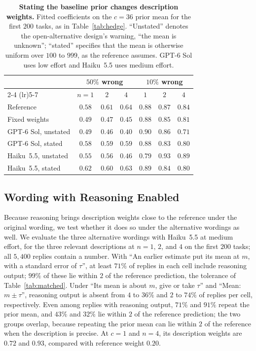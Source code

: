 \documentclass{article}
\theoremstyle{definition}
\begin{document}
\begin{table}[!htb]
\centering\small
\setlength{\tabcolsep}{3pt}
\caption{\textbf{Stating the baseline prior changes description weights.} Fitted coefficients on the $c=36$ prior mean for the first $200$ tasks, as in Table~\ref{tab:hedge}. ``Unstated'' denotes the open-alternative design's warning, ``the mean is unknown''; ``stated'' specifies that the mean is otherwise uniform over $100$ to $999$, as the reference assumes. GPT-6 Sol uses low effort and Haiku~5.5 uses medium effort.}
\label{tab:fallback}
\vspace{3pt}
\begin{tabular}{lcccccc}
\toprule
& \multicolumn{3}{c}{$50\%$ wrong} & \multicolumn{3}{c}{$10\%$ wrong} \\
\cmidrule(lr){2-4} \cmidrule(lr){5-7}
& $n=1$ & $2$ & $4$ & $1$ & $2$ & $4$ \\
\midrule
Reference & $0.58$ & $0.61$ & $0.64$ & $0.88$ & $0.87$ & $0.84$ \\
Fixed weights &$0.49$ & $0.47$ & $0.45$ & $0.88$ & $0.85$ & $0.81$ \\
GPT-6 Sol, unstated & $0.49$ & $0.46$ & $0.40$ & $0.90$ & $0.86$ & $0.71$ \\
GPT-6 Sol, stated & $0.58$ & $0.59$ & $0.59$ & $0.88$ & $0.83$ & $0.80$ \\
Haiku~5.5, unstated & $0.55$ & $0.56$ & $0.46$ & $0.79$ & $0.93$ & $0.89$ \\
Haiku~5.5, stated & $0.62$ & $0.60$ & $0.63$ & $0.89$ & $0.84$ & $0.80$ \\
\bottomrule
\end{tabular}
\end{table}

\subsection{Wording with Reasoning Enabled}\label{app:wording-reasoning}

Because reasoning brings description weights close to the reference under the original wording, we test whether it does so under the alternative wordings as well. We evaluate the three alternative wordings with Haiku~5.5 at medium effort, for the three relevant descriptions at $n = 1$, $2$, and $4$ on the first $200$ tasks; all $5{,}400$ replies contain a number. With ``An earlier estimate put its mean at $m$, with a standard error of $\tau$'', at least $71\%$ of replies in each cell include reasoning output; $99\%$ of these lie within $2$ of the reference prediction, the tolerance of Table~\ref{tab:matched}. Under ``Its mean is about $m$, give or take $\tau$'' and ``Mean: $m \pm \tau$'', reasoning output is absent from $4$ to $36\%$ and $2$ to $74\%$ of replies per cell, respectively. Even among replies with reasoning output, $71\%$ and $91\%$ repeat the prior mean, and $43\%$ and $32\%$ lie within $2$ of the reference prediction; the two groups overlap, because repeating the prior mean can lie within $2$ of the reference when the description is precise. At $c = 1$ and $n = 4$, its description weights are $0.72$ and $0.93$, compared with reference weight $0.20$.
\end{document}
